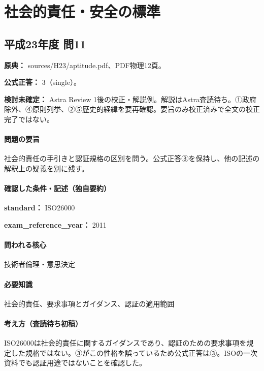 \section{社会的責任・安全の標準}

\subsection{平成23年度 問11}
\label{q:h23-reg-apt-11}

\noindent\textbf{原典：} sources/H23/aptitude.pdf、PDF物理12頁。

\textbf{公式正答：} 3（single）。

\par\textbf{検討未確定：} Astra Review 1後の校正・解説例。解説はAstra査読待ち。①政府除外、④原則列挙、②⑤歴史的経緯を要再確認。要旨のみ校正済みで全文の校正完了ではない。

\paragraph{問題の要旨} 社会的責任の手引きと認証規格の区別を問う。公式正答③を保持し、他の記述の解釈上の疑義を別に残す。

\paragraph{確認した条件・記述（独自要約）}\mbox{}\par

\noindent\textbf{standard：} ISO26000\par

\noindent\textbf{exam\_reference\_year：} 2011\par

\paragraph{問われる核心} 技術者倫理・意思決定

\paragraph{必要知識} 社会的責任、要求事項とガイダンス、認証の適用範囲

\paragraph{考え方（査読待ち初稿）} ISO26000は社会的責任に関するガイダンスであり、認証のための要求事項を規定した規格ではない。③がこの性格を誤っているため公式正答は③。ISOの一次資料でも認証用途ではないことを確認した。

